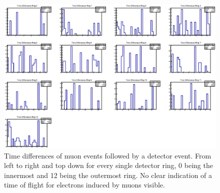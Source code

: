   \begin{figure}
  \centering
  	\includegraphics[width = 0.9 \textwidth]{graphics/mainSpec/mainSpecRings.eps}
  	\caption[Time difference Histogram for all rings]{Time differences of muon events followed by a detector event. From left to right and top down for every single detector ring, 0 being the innermost and 12 being the outermost ring. No clear indication of a time of flight for electrons induced by muons visible.}
  	\label{fig:mainSpec:allRings}
  \end{figure}

